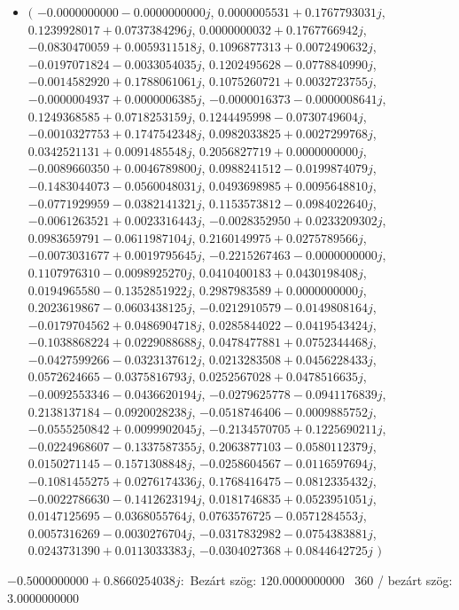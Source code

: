 \documentclass[14pt,a4paper]{article}
\begin{document}
\begin{itemize}
\item
$\big($
$-0.0000000000-0.0000000000j$, $0.0000005531+0.1767793031j$, $0.1239928017+0.0737384296j$, $0.0000000032+0.1767766942j$, $-0.0830470059+0.0059311518j$, $0.1096877313+0.0072490632j$, $-0.0197071824-0.0033054035j$, $0.1202495628-0.0778840990j$, $-0.0014582920+0.1788061061j$, $0.1075260721+0.0032723755j$, $-0.0000004937+0.0000006385j$, $-0.0000016373-0.0000008641j$, $0.1249368585+0.0718253159j$, $0.1244495998-0.0730749604j$, $-0.0010327753+0.1747542348j$, $0.0982033825+0.0027299768j$, $0.0342521131+0.0091485548j$, $0.2056827719+0.0000000000j$, $-0.0089660350+0.0046789800j$, $0.0988241512-0.0199874079j$, $-0.1483044073-0.0560048031j$, $0.0493698985+0.0095648810j$, $-0.0771929959-0.0382141321j$, $0.1153573812-0.0984022640j$, $-0.0061263521+0.0023316443j$, $-0.0028352950+0.0233209302j$, $0.0983659791-0.0611987104j$, $0.2160149975+0.0275789566j$, $-0.0073031677+0.0019795645j$, $-0.2215267463-0.0000000000j$, $0.1107976310-0.0098925270j$, $0.0410400183+0.0430198408j$, $0.0194965580-0.1352851922j$, $0.2987983589+0.0000000000j$, $0.2023619867-0.0603438125j$, $-0.0212910579-0.0149808164j$, $-0.0179704562+0.0486904718j$, $0.0285844022-0.0419543424j$, $-0.1038868224+0.0229088688j$, $0.0478477881+0.0752344468j$, $-0.0427599266-0.0323137612j$, $0.0213283508+0.0456228433j$, $0.0572624665-0.0375816793j$, $0.0252567028+0.0478516635j$, $-0.0092553346-0.0436620194j$, $-0.0279625778-0.0941176839j$, $0.2138137184-0.0920028238j$, $-0.0518746406-0.0009885752j$, $-0.0555250842+0.0099902045j$, $-0.2134570705+0.1225690211j$, $-0.0224968607-0.1337587355j$, $0.2063877103-0.0580112379j$, $0.0150271145-0.1571308848j$, $-0.0258604567-0.0116597694j$, $-0.1081455275+0.0276174336j$, $0.1768416475-0.0812335432j$, $-0.0022786630-0.1412623194j$, $0.0181746835+0.0523951051j$, $0.0147125695-0.0368055764j$, $0.0763576725-0.0571284553j$, $0.0057316269-0.0030276704j$, $-0.0317832982-0.0754383881j$, $0.0243731390+0.0113033383j$, $-0.0304027368+0.0844642725j$
$\big)$
\end{itemize}
$-0.5000000000+0.8660254038j$:\
Bezárt szög: $120.0000000000$ \
360 / bezárt szög: $3.0000000000$\
\end{document}
